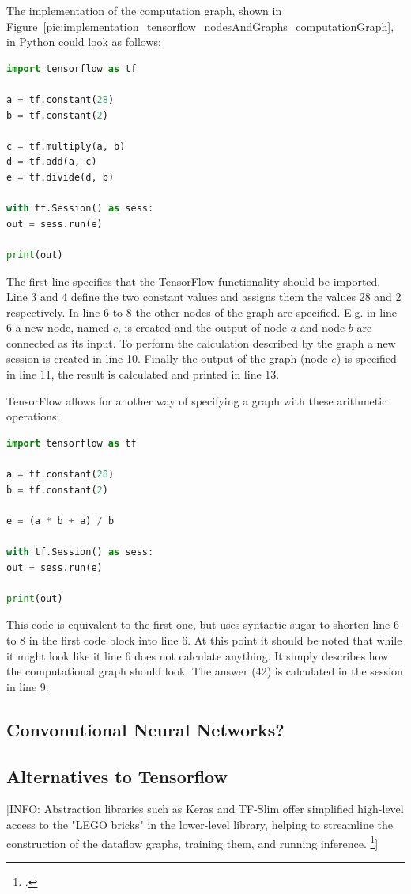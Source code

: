 The implementation of the computation graph, shown in Figure~\ref{pic:implementation_tensorflow_nodesAndGraphs_computationGraph}, in Python could look as follows:

\begin{lstlisting}[language=python]
import tensorflow as tf

a = tf.constant(28)
b = tf.constant(2)

c = tf.multiply(a, b)
d = tf.add(a, c)
e = tf.divide(d, b)

with tf.Session() as sess:
out = sess.run(e)

print(out)
\end{lstlisting}

The first line specifies that the TensorFlow functionality should be imported. Line 3 and 4 define the two constant values and assigns them the values 28 and 2 respectively. In line 6 to 8 the other nodes of the graph are specified. E.g. in line 6 a new node, named $c$, is created and the output of node $a$ and node $b$ are connected as its input. To perform the calculation described by the graph a new session is created in line 10. Finally the output of the graph (node $e$) is specified in line 11, the result is calculated and printed in line 13.

TensorFlow allows for another way of specifying a graph with these arithmetic operations:

\begin{lstlisting}[language=python]
import tensorflow as tf

a = tf.constant(28)
b = tf.constant(2)

e = (a * b + a) / b

with tf.Session() as sess:
out = sess.run(e)

print(out)
\end{lstlisting}

This code is equivalent to the first one, but uses syntactic sugar to shorten line 6 to 8 in the first code block into line 6. At this point it should be noted that while it might look like it line 6 does not calculate anything. It simply describes how the computational graph should look. The answer (42) is calculated in the session in line 9.

\subsection{Convonutional Neural Networks?}

\subsection{Alternatives to Tensorflow}
[INFO: Abstraction libraries such as Keras and TF-Slim offer simplified  high-level  access  to  the  "LEGO  bricks"  in  the  lower-level  library,  helping  to streamline the construction of the dataflow graphs, training them, and running inference. \footcite[page 7]{Hope_Learning_TensorFlow}]

